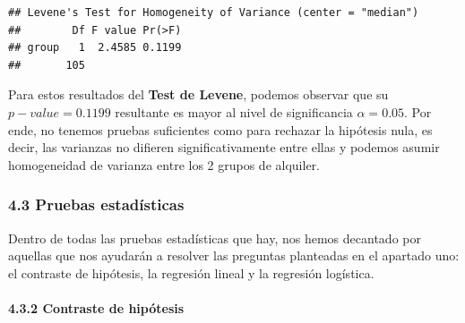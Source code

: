 \documentclass[
]{article}
\newenvironment{Shaded}{\begin{snugshade}}{\end{snugshade}}
\newcommand{\AttributeTok}[1]{\textcolor[rgb]{0.13,0.29,0.53}{#1}}
\newcommand{\CommentTok}[1]{\textcolor[rgb]{0.56,0.35,0.01}{\textit{#1}}}
\newcommand{\FunctionTok}[1]{\textcolor[rgb]{0.13,0.29,0.53}{\textbf{#1}}}
\newcommand{\NormalTok}[1]{#1}
\newcommand{\OtherTok}[1]{\textcolor[rgb]{0.56,0.35,0.01}{#1}}
\newcommand{\SpecialCharTok}[1]{\textcolor[rgb]{0.81,0.36,0.00}{\textbf{#1}}}
\newcommand{\StringTok}[1]{\textcolor[rgb]{0.31,0.60,0.02}{#1}}
\begin{document}
\begin{Shaded}
\end{Shaded}

\begin{verbatim}
## Levene's Test for Homogeneity of Variance (center = "median")
##        Df F value Pr(>F)
## group   1  2.4585 0.1199
##       105
\end{verbatim}

Para estos resultados del \textbf{Test de Levene}, podemos observar que
su \(p-value=0.1199\) resultante es mayor al nivel de significancia
\(\alpha=0.05\). Por ende, no tenemos pruebas suficientes como para
rechazar la hipótesis nula, es decir, las varianzas no difieren
significativamente entre ellas y podemos asumir homogeneidad de varianza
entre los 2 grupos de alquiler.

\hypertarget{pruebas-estaduxedsticas}{%
\subsubsection{4.3 Pruebas estadísticas}\label{pruebas-estaduxedsticas}}

\hfill\break
Dentro de todas las pruebas estadísticas que hay, nos hemos decantado
por aquellas que nos ayudarán a resolver las preguntas planteadas en el
apartado uno: el contraste de hipótesis, la regresión lineal y la
regresión logística.

\hypertarget{contraste-de-hipuxf3tesis}{%
\paragraph{4.3.2 Contraste de
hipótesis}\label{contraste-de-hipuxf3tesis}}
\end{document}
